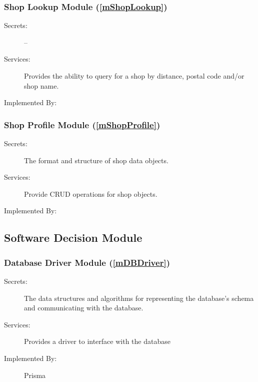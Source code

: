 \documentclass[12pt, titlepage]{article}
\begin{document}
\subsubsection{Shop Lookup Module (\ref{mShopLookup})}

\begin{description}
	\item[Secrets:] --
	\item[Services:] Provides the ability to query for a shop by distance, postal code and/or shop name.
	\item[Implemented By:] \progname{}
\end{description}

\subsubsection{Shop Profile Module (\ref{mShopProfile})}

\begin{description}
	\item[Secrets:] The format and structure of shop data objects.
	\item[Services:] Provide CRUD operations for shop objects.
	\item[Implemented By:] \progname{}
\end{description}

\subsection{Software Decision Module}


\subsubsection{Database Driver Module (\ref{mDBDriver})}
\begin{description}
	\item[Secrets:] The data structures and algorithms for representing the database's schema and
		communicating with the database.
	\item[Services:] Provides a driver to interface with the database
	\item[Implemented By:] Prisma
\end{description}
\end{document}
